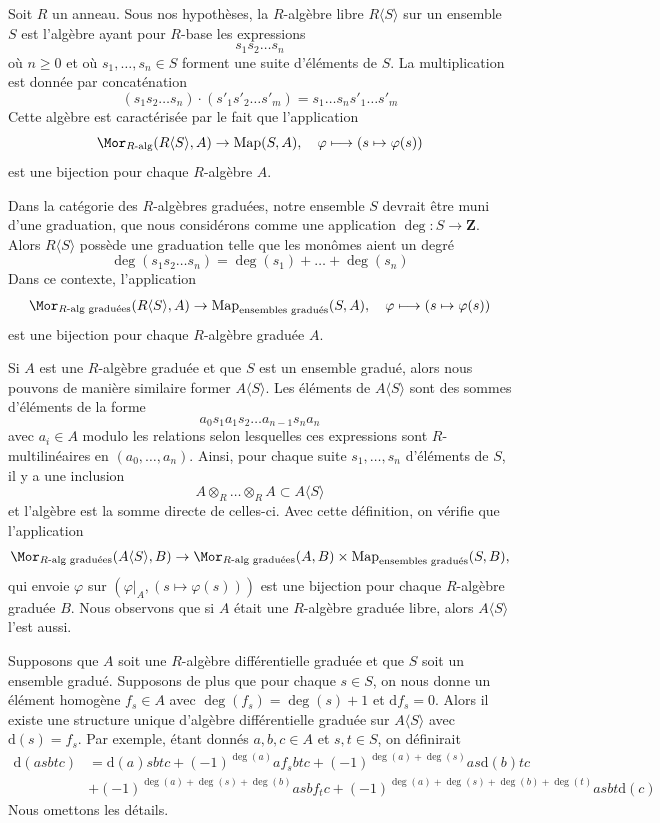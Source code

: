 \noindent
Soit $R$ un anneau. Sous nos hypothèses, la $R$-algèbre libre
$R\langle S \rangle$ sur un ensemble $S$ est l'algèbre ayant pour $R$-base
les expressions
$$
s_1 s_2 \ldots s_n
$$
où $n \geq 0$ et où $s_1, \ldots, s_n \in S$ forment une suite
d'éléments de $S$. La multiplication est donnée par concaténation
$$
(s_1 s_2 \ldots s_n) \cdot (s'_1 s'_2 \ldots s'_m) =
s_1 \ldots s_n s'_1 \ldots s'_m
$$
Cette algèbre est caractérisée par le fait que l'application
$$
\Mor_{R\text{-alg}}(R\langle S \rangle, A) \to
\text{Map}(S, A),\quad
\varphi \longmapsto (s \mapsto \varphi(s))
$$
est une bijection pour chaque $R$-algèbre $A$.

\medskip\noindent
Dans la catégorie des $R$-algèbres graduées, notre ensemble $S$ devrait être
muni d'une graduation, que nous considérons comme une application $\deg : S \to
\mathbf{Z}$. Alors $R\langle S\rangle$ possède une graduation telle que les monômes
aient un degré
$$
\deg(s_1 s_2 \ldots s_n) = \deg(s_1) + \ldots + \deg(s_n)
$$
Dans ce contexte, l'application
$$
\Mor_{\text{}R\text{-alg graduées}}(R\langle S \rangle, A) \to
\text{Map}_{\text{ensembles gradués}}(S,
A),\quad \varphi \longmapsto (s \mapsto \varphi(s))
$$
est une bijection pour chaque $R$-algèbre graduée $A$.

\medskip\noindent
Si $A$ est une $R$-algèbre graduée et que $S$ est un ensemble gradué,
alors nous pouvons de manière similaire former $A\langle S
\rangle$. Les éléments de $A\langle S \rangle$ sont
des sommes d'éléments de la forme
$$
a_0 s_1 a_1 s_2 \ldots a_{n - 1} s_n a_n
$$
avec $a_i \in A$ modulo les relations selon lesquelles ces
expressions sont $R$-multilinéaires en $(a_0, \ldots,
a_n)$. Ainsi, pour chaque suite $s_1, \ldots, s_n$ d'éléments de $S$,
il y a une inclusion
$$
A \otimes_R \ldots \otimes_R A \subset A\langle S \rangle
$$
et l'algèbre est la somme directe de celles-ci. Avec cette définition, on
vérifie que l'application
$$
\Mor_{\text{}R\text{-alg graduées}}(A\langle S \rangle, B) \to
\Mor_{\text{}R\text{-alg graduées}}(A, B) \times
\text{Map}_{\text{ensembles gradués}}(S, B),
$$
qui envoie $\varphi$ sur $(\varphi|_A, (s \mapsto \varphi(s)))$ est
une bijection pour chaque $R$-algèbre graduée $B$. Nous
observons que si $A$ était une $R$-algèbre graduée libre,
alors $A\langle S \rangle$ l'est aussi.

\medskip\noindent
Supposons que $A$ soit une $R$-algèbre différentielle graduée
et que $S$ soit un ensemble gradué. Supposons de plus que pour
chaque $s \in S$, on nous donne un élément homogène $f_s \in A$ avec $\deg(f_s) = \deg(s)
+ 1$ et $\text{d}f_s = 0$. Alors il existe une structure unique
d'algèbre différentielle graduée sur $A\langle S \rangle$ avec
$\text{d}(s) = f_s$. Par exemple, étant donnés $a, b, c \in A$ et
$s, t \in S$, on définirait
\begin{align*}
\text{d}(asbtc)
& =
\text{d}(a)sbtc + (-1)^{\deg(a)}a f_s b t c +
(-1)^{\deg(a) + \deg(s)} as\text{d}(b)tc \\ &
+ (-1)^{\deg(a) + \deg(s) + \deg(b)} asb f_t c +
(-1)^{\deg(a) + \deg(s) + \deg(b) + \deg(t)} asbt\text{d}(c)
\end{align*}
Nous omettons les détails.

